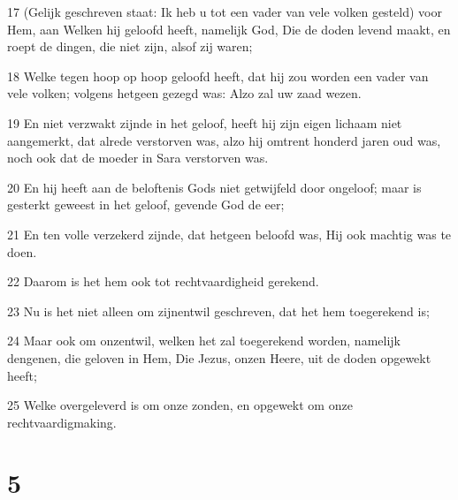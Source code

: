 \par 17 (Gelijk geschreven staat: Ik heb u tot een vader van vele volken gesteld) voor Hem, aan Welken hij geloofd heeft, namelijk God, Die de doden levend maakt, en roept de dingen, die niet zijn, alsof zij waren;
\par 18 Welke tegen hoop op hoop geloofd heeft, dat hij zou worden een vader van vele volken; volgens hetgeen gezegd was: Alzo zal uw zaad wezen.
\par 19 En niet verzwakt zijnde in het geloof, heeft hij zijn eigen lichaam niet aangemerkt, dat alrede verstorven was, alzo hij omtrent honderd jaren oud was, noch ook dat de moeder in Sara verstorven was.
\par 20 En hij heeft aan de beloftenis Gods niet getwijfeld door ongeloof; maar is gesterkt geweest in het geloof, gevende God de eer;
\par 21 En ten volle verzekerd zijnde, dat hetgeen beloofd was, Hij ook machtig was te doen.
\par 22 Daarom is het hem ook tot rechtvaardigheid gerekend.
\par 23 Nu is het niet alleen om zijnentwil geschreven, dat het hem toegerekend is;
\par 24 Maar ook om onzentwil, welken het zal toegerekend worden, namelijk dengenen, die geloven in Hem, Die Jezus, onzen Heere, uit de doden opgewekt heeft;
\par 25 Welke overgeleverd is om onze zonden, en opgewekt om onze rechtvaardigmaking.

\chapter{5}

